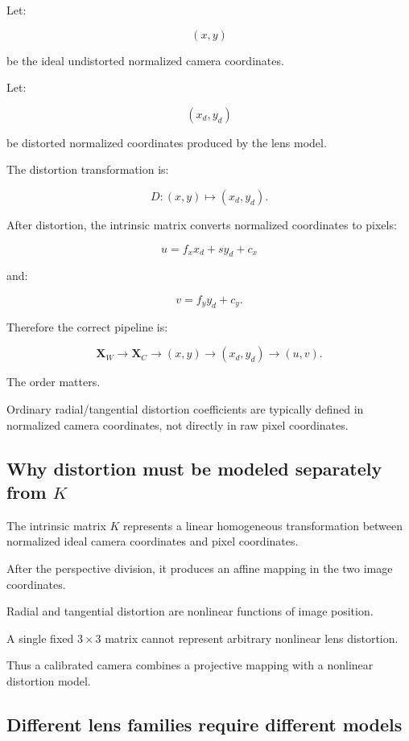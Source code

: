 Let:

\[
 (x,y)
\]

be the ideal undistorted normalized camera coordinates.

Let:

\[
 (x_d,y_d)
\]

be distorted normalized coordinates produced by the lens model.

The distortion transformation is:

\[
 \boxed{ D: (x,y)\mapsto(x_d,y_d) }.
\]

After distortion, the intrinsic matrix converts normalized coordinates to pixels:

\[
 \boxed{ u=f_xx_d+sy_d+c_x }
\]

and:

\[
 \boxed{ v=f_yy_d+c_y }.
\]

Therefore the correct pipeline is:

\[
 \boxed{ \mathbf X_W \rightarrow \mathbf X_C \rightarrow (x,y) \rightarrow (x_d,y_d) \rightarrow (u,v) }.
\]

The order matters.

Ordinary radial/tangential distortion coefficients are typically defined in normalized camera coordinates, not directly in raw pixel coordinates.

\subsection{\texorpdfstring{Why distortion must be modeled separately from \(K\)}{Why distortion must be modeled separately from K}}\label{02-foundations-ii-ch035-why-distortion-must-be-modeled-separately-from-k}

The intrinsic matrix \(K\) represents a linear homogeneous transformation between normalized ideal camera coordinates and pixel coordinates.

After the perspective division, it produces an affine mapping in the two image coordinates.

Radial and tangential distortion are nonlinear functions of image position.

A single fixed \(3\times3\) matrix cannot represent arbitrary nonlinear lens distortion.

Thus a calibrated camera combines a projective mapping with a nonlinear distortion model.

\subsection{Different lens families require different models}\label{02-foundations-ii-ch035-different-lens-families-require-different-models}

